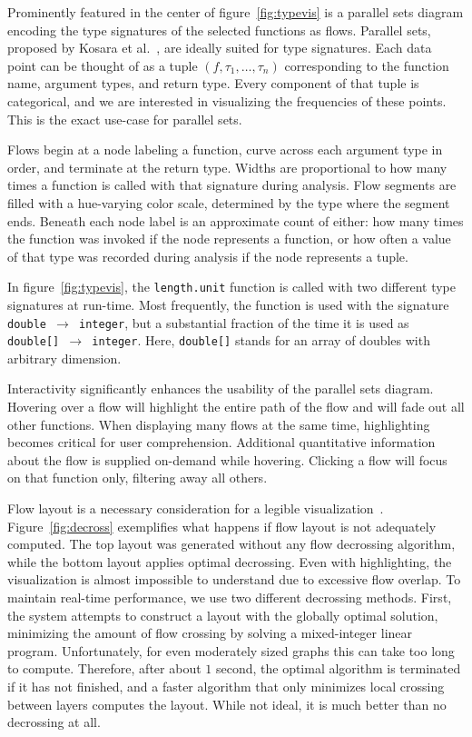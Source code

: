 \documentclass{vgtc}                          %
\begin{document}
Prominently featured in the center of figure~\ref{fig:typevis}
is a parallel sets diagram encoding the type signatures of the selected
functions as flows.
Parallel sets,
proposed by Kosara et al.~\cite{kosara:2006},
are ideally suited for type signatures.
Each data point can be thought of as
a tuple $(f, \tau_1, \ldots, \tau_n)$
corresponding to the function name,
argument types,
and return type.
Every component of that tuple is categorical,
and we are interested in visualizing the frequencies of these points.
This is the exact use-case for parallel sets.

Flows begin at a node labeling a function,
curve across each argument type in order,
and terminate at the return type.
Widths are proportional to how many times a function
is called with that signature during analysis.
Flow segments are filled with a hue-varying color scale,
determined by the type where the segment ends.
Beneath each node label is an approximate count of either:
how many times the function was invoked if the node represents a function,
or how often a value of that type was recorded during analysis if the node represents a tuple.

In figure~\ref{fig:typevis},
the {\tt length.unit} function is called with
two different type signatures at run-time.
Most frequently, the function is used with the
signature {\tt double $\to$ integer},
but a substantial fraction of the time it is
used as {\tt double[] $\to$ integer}.
Here, {\tt double[]} stands for an array of
doubles with arbitrary dimension.

Interactivity significantly enhances the
usability of the parallel sets diagram.
Hovering over a flow will highlight the
entire path of the flow
and will fade out all other functions.
When displaying many flows at the same time,
highlighting becomes critical
for user comprehension.
Additional quantitative information
about the flow is supplied on-demand while hovering.
Clicking a flow will focus on that function
only, filtering away all others.

Flow layout is a necessary consideration
for a legible visualization~\cite{sugiyama:1981}.
Figure~\ref{fig:decross} exemplifies what
happens if flow layout is not adequately computed.
The top layout was generated without any
flow decrossing algorithm,
while the bottom layout applies optimal decrossing.
Even with highlighting,
the visualization is almost impossible to understand
due to excessive flow overlap.
To maintain real-time performance,
we use two different decrossing methods.
First, the system attempts to construct
a layout with the globally optimal solution,
minimizing the amount of flow crossing by
solving a mixed-integer linear program.
Unfortunately, for even moderately
sized graphs this can take too long to compute.
Therefore, after about $1$ second,
the optimal algorithm is terminated
if it has not finished, and a faster
algorithm that only minimizes local crossing between layers
computes the layout.
While not ideal, it is much better than no decrossing
at all.
\end{document}
